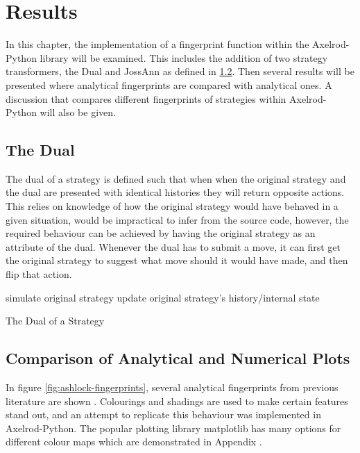 
\chapter{Results}\label{cha:results}

In this chapter, the implementation of a fingerprint function within the Axelrod-Python library will be examined.
This includes the addition of two strategy transformers, the Dual and JossAnn as defined in \ref{}. %
Then several results will be presented where analytical fingerprints are compared with analytical ones.
A discussion that compares different fingerprints of strategies within Axelrod-Python will also be given.

\section{The Dual}
The dual of a strategy is defined such that when when the original strategy and the dual are presented with identical histories they will return opposite actions.
This relies on knowledge of how the original strategy would have behaved in a given situation, would be impractical to infer from the source code, however, the required behaviour can be achieved by having the original strategy as an attribute of the dual.
Whenever the dual has to submit a move, it can first get the original strategy to suggest what move should it would have made, and then flip that action.

\IncMargin{1.2em}
\begin{algorithm}[H]
  simulate original strategy\;
  update original strategy's history/internal state\;
 \caption{The Dual of a Strategy}
\end{algorithm}\DecMargin{1.5em}

\section{Comparison of Analytical and Numerical Plots}

In figure \ref{fig:ashlock-fingerprints}, several analytical fingerprints from previous literature are shown \cite{Ashlock2004}.
Colourings and shadings are used to make certain features stand out, and an attempt to replicate this behaviour was implemented in Axelrod-Python.
The popular plotting library matplotlib has many options for different colour maps which are demonstrated in Appendix . %

